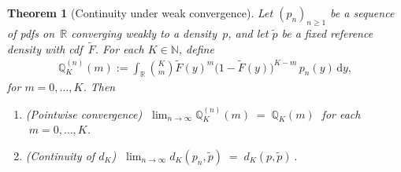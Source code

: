 \documentclass{article}
\newtheorem{theorem}{Theorem}[section]
\begin{document}


\begin{theorem}[Continuity under weak convergence]
\label{thm:rankWeakConv}
Let $(p_n)_{n\ge1}$ be a sequence of pdfs on~$\mathbb{R}$ converging weakly to a density~$p$, and let $\tilde p$ be a fixed reference density with cdf~$\tilde F$.  For each $K\in\mathbb{N}$, define
\begin{align*}
\mathbb Q_K^{(n)}(m)
:=\int_{\mathbb{R}}\binom Km\tilde F(y)^m\bigl(1-\tilde F(y)\bigr)^{K-m}\,p_n(y)\,\mathrm{d} y,
\end{align*}
for $m=0,\dots,K$.  Then
\begin{enumerate}[label=(\roman*)]
  \item (\emph{Pointwise convergence})  
    $\;\lim_{n\to \infty}\mathbb Q_K^{(n)}(m)\;=\;\mathbb Q_K(m)\;$ for each $\;m=0,\dots,K$.
  \item (\emph{Continuity of $d_K$}) $\;\lim_{n\to \infty}d_K(p_n,\tilde p)\;=\;d_K(p,\tilde p)\,$.
\end{enumerate}
\end{theorem}
\end{document}
